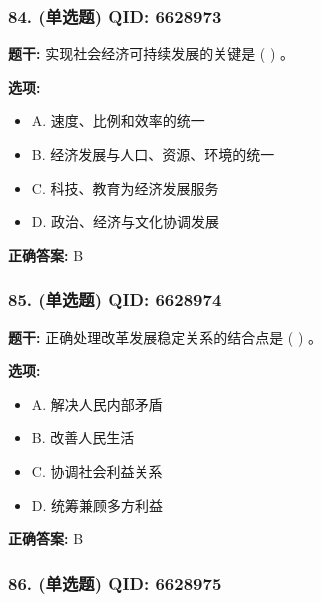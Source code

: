 \documentclass[12pt,UTF8]{ctexart}
\begin{document}
\subsubsection*{84. (单选题) \small QID: 6628973}

\textbf{题干:}
实现社会经济可持续发展的关键是  ( )  。

\textbf{选项:}
\begin{itemize}[leftmargin=*]

  \item A. 速度、比例和效率的统一

  \item B. 经济发展与人口、资源、环境的统一

  \item C. 科技、教育为经济发展服务

  \item D. 政治、经济与文化协调发展

\end{itemize}

\textbf{正确答案:}
B

\vspace{0.3em}\hrulefill\vspace{0.7em}

\subsubsection*{85. (单选题) \small QID: 6628974}

\textbf{题干:}
正确处理改革发展稳定关系的结合点是  ( )  。

\textbf{选项:}
\begin{itemize}[leftmargin=*]

  \item A. 解决人民内部矛盾

  \item B. 改善人民生活

  \item C. 协调社会利益关系

  \item D. 统筹兼顾多方利益

\end{itemize}

\textbf{正确答案:}
B

\vspace{0.3em}\hrulefill\vspace{0.7em}

\subsubsection*{86. (单选题) \small QID: 6628975}
\end{document}
